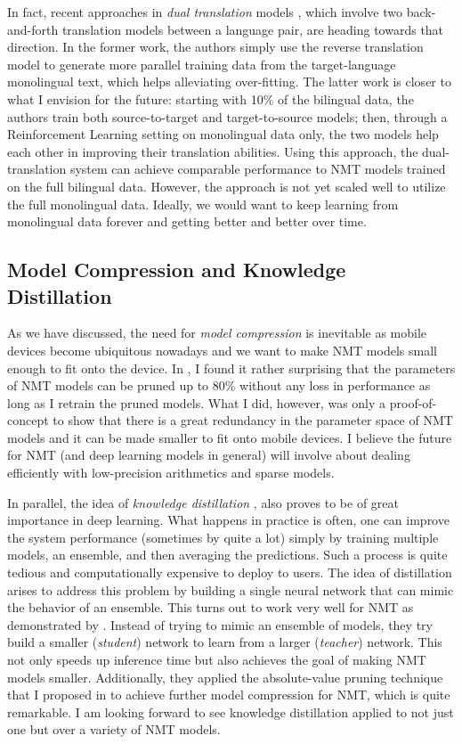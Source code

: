 In fact, recent approaches in {\it dual translation} models \cite{sennrich16mono,xia16}, which involve two back-and-forth translation models between a language pair, are heading towards that direction. In the former work, the authors simply use the reverse translation model to generate more parallel training data from the target-language monolingual text, which helps alleviating over-fitting. The latter work is closer to what I envision for the future: starting with 10\% of the bilingual data, the authors train both source-to-target and target-to-source models; then, through a Reinforcement Learning setting on monolingual data only, the two models help each other in improving their translation abilities. Using this approach, the dual-translation system can achieve comparable performance to NMT models trained on the full bilingual data. However, the approach is not yet scaled well to utilize the full monolingual data. Ideally, we would want to keep learning from monolingual data forever and getting better and better over time.

\subsection{Model Compression and Knowledge Distillation}
As we have discussed, the need for {\it model compression} is inevitable as mobile devices become ubiquitous nowadays and we want to make NMT models small enough to fit onto the device. In , I found it rather surprising that the parameters of NMT models can be pruned up to 80\% without any loss in performance as long as I retrain the pruned models. What I did, however, was only a proof-of-concept to show that there is a great redundancy in the parameter space of NMT models and it can be made smaller to fit onto mobile devices. I believe the future for NMT (and deep learning models in general) will involve about dealing efficiently with low-precision arithmetics \cite{courbariaux14,gupta15} and sparse models.

In parallel, the idea of {\it knowledge distillation} \cite{hinton15}, also proves to be of great importance in deep learning. What happens in practice is often, one can improve the system performance (sometimes by quite a lot) simply by training multiple models, an ensemble, and then averaging the predictions. Such a process is quite tedious and computationally expensive to deploy to users. The idea of distillation arises to address this problem by building a single neural network that can mimic the behavior of an ensemble. This turns out to work very well for NMT as demonstrated by . Instead of trying to mimic an ensemble of models, they try build a smaller ({\it student}) network to learn from a larger ({\it teacher}) network. This not only speeds up inference time but also achieves the goal of making NMT models smaller. Additionally, they applied the absolute-value pruning technique that I proposed in  to achieve further model compression for NMT, which is quite remarkable. I am looking forward to see knowledge distillation applied to not just one but over a variety of NMT models.

